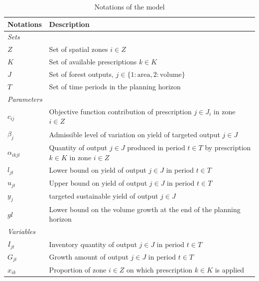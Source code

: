\documentclass[preprint,12pt]{elsarticle}
\begin{document}
\begin{table}[H]
\caption{Notations of the model} %
\label{tab:Notations} %
\centering
\begin{tabular}{lp{10cm}} %
\hline
\textbf{Notations} & \textbf{Description} \\
\hline
\textit{Sets} &  \\
\hline
$Z$ & Set of spatial zones $i \in Z$ \\

$K$ & Set of available prescriptions $k \in K$ \\
$J$ & Set of forest outputs, $j \in \{1: \text{area}, 2: \text{volume}\}$ \\
$T$ & Set of time periods in the planning horizon \\
\hline
\textit{Parameters} & \\
\hline
$c_{ij}$ & Objective function contribution of prescription $j \in J_i$ in zone $i \in Z$ \\
$\beta_j$ & Admissible level of variation on yield of targeted output $j \in J$ \\
$\alpha_{ikjt}$ & Quantity of output $j \in J$ produced in period $t \in T$ by prescription $k \in K$ in zone $i \in Z$ \\
$l_{jt}$ & Lower bound on yield of output $j \in J$ in period $t \in T$ \\
$u_{jt}$ & Upper bound on yield of output $j \in J$ in period $t \in T$ \\
$y_{j}$ & targeted sustainable yield of output $j \in J$  \\
$gl$ & Lower bound on the volume growth at the end of the planning horizon\\
\hline
\textit{Variables} &  \\
\hline
$I_{jt}$ & Inventory quantity of output $j \in J$ in period $t \in T$\\
$G_{jt}$ & Growth amount of output $j \in J$ in period $t \in T$\\
$x_{ik}$ & Proportion of zone $i \in Z$ on which prescription $k \in K$ is applied
\end{tabular}
\label{tab:model}
\end{table}
\end{document}
